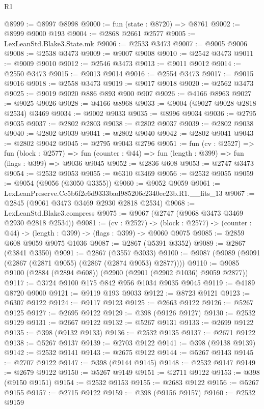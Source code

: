 \begin{lexlean}{R1}
\begin{coremodule}
@8999 := @8997 @8998
@9000 := fun (state : @8720) => @8761
@9002 := @8999 @9000 @193
@9004 := @2868 @2661 @2577
@9005 := LexLeanStd.Blake3.State.mk
@9006 := @2533 @3473
@9007 := @9005 @9006
@9008 := @2538 @3473
@9009 := @9007 @9008
@9010 := @2542 @3473
@9011 := @9009 @9010
@9012 := @2546 @3473
@9013 := @9011 @9012
@9014 := @2550 @3473
@9015 := @9013 @9014
@9016 := @2554 @3473
@9017 := @9015 @9016
@9018 := @2558 @3473
@9019 := @9017 @9018
@9020 := @2562 @3473
@9025 := @9019 @9020 @886 @893 @900 @907
@9026 := @4166 @8963
@9027 := @9025 @9026
@9028 := @4166 @8968
@9033 := @9004 (@9027 @9028 @2818 @2534) @3469
@9034 := @9002 @9033
@9035 := @8996 @9034
@9036 := @2795 @9035
@9037 := @2802 @2803
@9038 := @2802 @9037
@9039 := @2802 @9038
@9040 := @2802 @9039
@9041 := @2802 @9040
@9042 := @2802 @9041
@9043 := @2802 @9042
@9045 := @2795 @9043 @2796
@9051 := fun (cv : @2527) =>
  fun (block : @2577) =>
  fun (counter : @44) => fun (length : @399) => fun (flags : @399) => @9036 @9045
@9052 := @2836 @608
@9053 := @2747 @3473
@9054 := @2532 @9053
@9055 := @6310 @3469
@9056 := @2532 @9055
@9059 := @9054 (@9056 (@3050 @3355))
@9060 := @9052 @9059
@9061 := LexLeanPreserve.Cc5b6f2e6d9333bad985206c2340ec23b.R1.__fits_13
@9067 := @2845 (@9061 @3473 @3469 @2930 @2818 @2534)
@9068 := LexLeanStd.Blake3.compress
@9075 := @9067 (@2747 (@9068 @3473 @3469 @2930 @2818 @2534))
@9081 := (cv : @2527) ->
  (block : @2577) -> (counter : @44) -> (length : @399) -> (flags : @399) -> @9060 @9075
@9085 := @2859 @608 @9059 @9075 @1036
@9087 := @2867 (@5391 @3352)
@9089 := @2867 (@3841 @3350)
@9091 := @2867 (@3557 @3033)
@9100 := @9087 (@9089 (@9091 (@2867 (@2871 @9055) (@2867 (@2874 @9053) @2877))))
@9110 := @9085 @9100 (@2884 (@2894 @608)) (@2900 (@2901 (@2902 @1036) @9059 @2877))
@9117 := @3724 @9100 @175 @842 @956 @1034 @9035 @9045
@9119 := @4189 @8720 @9000
@9121 := @9119 @193 @9033
@9122 := @8723 @9121
@9123 := @6307 @9122
@9124 := @9117 @9123
@9125 := @2663 @9122
@9126 := @5267 @9125
@9127 := @2695 @9122
@9129 := @398 (@9126 @9127)
@9130 := @2532 @9129
@9131 := @2667 @9122
@9132 := @5267 @9131
@9133 := @2699 @9122
@9135 := @398 (@9132 @9133)
@9136 := @2532 @9135
@9137 := @2671 @9122
@9138 := @5267 @9137
@9139 := @2703 @9122
@9141 := @398 (@9138 @9139)
@9142 := @2532 @9141
@9143 := @2675 @9122
@9144 := @5267 @9143
@9145 := @2707 @9122
@9147 := @398 (@9144 @9145)
@9148 := @2532 @9147
@9149 := @2679 @9122
@9150 := @5267 @9149
@9151 := @2711 @9122
@9153 := @398 (@9150 @9151)
@9154 := @2532 @9153
@9155 := @2683 @9122
@9156 := @5267 @9155
@9157 := @2715 @9122
@9159 := @398 (@9156 @9157)
@9160 := @2532 @9159

\end{coremodule}
\end{lexlean}
